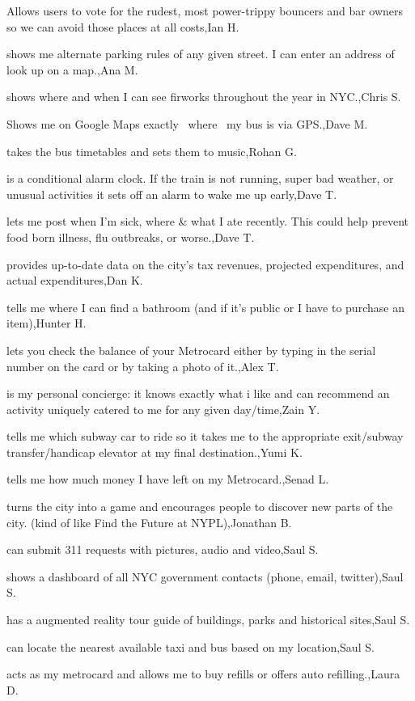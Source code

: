 \documentclass{article}
\begin{document}
Allows users to vote for the rudest, most power-trippy bouncers and bar owners so we can avoid those places at all costs,Ian H.

shows me alternate parking rules of any given street. I can enter an address of look up on a map.,Ana M.

shows where and when I can see firworks throughout the year in NYC.,Chris S.

Shows me on Google Maps exactly ~where~ my bus is via GPS.,Dave M.

takes the bus timetables and sets them to music,Rohan G.

is a conditional alarm clock. If the train is not running, super bad weather, or unusual activities it sets off an alarm to wake me up early,Dave T.

lets me post when I'm sick, where \& what I ate recently.  This could help prevent food born illness, flu outbreaks, or worse.,Dave T.

provides up-to-date data on the city's tax revenues, projected expenditures, and actual expenditures,Dan K.

tells me where I can find a bathroom (and if it's public or I have to purchase an item),Hunter H.

lets you check the balance of your Metrocard either by typing in the serial number on the card or by taking a photo of it.,Alex T.

is my personal concierge: it knows exactly what i like and can recommend an activity uniquely catered to me for any given day/time,Zain Y.

tells me which subway car to ride so it takes me to the appropriate exit/subway transfer/handicap elevator at my final destination.,Yumi K.

tells me how much money I have left on my Metrocard.,Senad L.

turns the city into a game and encourages people to discover new parts of the city. (kind of like Find the Future at NYPL),Jonathan B.

can submit 311 requests with pictures, audio and video,Saul S.

shows a dashboard of all NYC government contacts (phone, email, twitter),Saul S.

has a augmented reality tour guide of buildings, parks and historical sites,Saul S.

can locate the nearest available taxi and bus based on my location,Saul S.

acts as my metrocard and allows me to buy refills or offers auto refilling.,Laura D.
\end{document}
